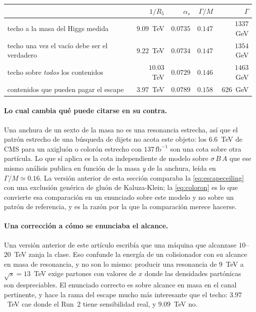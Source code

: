 \documentclass[11pt,a4paper]{article}
\begin{document}
\begin{center}\small
{}
\begin{tabular}{lrrrr}
\toprule
\rowcolor{hdrblue!10} & $1/R_5$ & $\alpha_s$ & $\Gamma/M$ & $\Gamma$\\
\midrule
\rowcolor{amber!14}techo a la masa del Higgs medida & $9.09$~TeV & $0.0735$ & $0.147$ & $1337$~GeV\\
techo una vez el vacío debe ser el verdadero & $9.22$~TeV & $0.0734$ & $0.147$ & $1354$~GeV\\
techo sobre \emph{todos} los contenidos & $10.03$~TeV & $0.0729$ & $0.146$ & $1463$~GeV\\
contenidos que pueden pagar el escape & $3.97$~TeV & $0.0789$ & $0.158$ & $626$~GeV\\
\bottomrule
\end{tabular}
\end{center}

\paragraph{Lo cual cambia qué puede citarse en su contra.} Una anchura de un sexto de la masa no es
una resonancia estrecha, así que el patrón estrecho de una búsqueda de dijets no acota este objeto:
los $6.6$~TeV de CMS para un axigluón o colorón estrecho con $137\,\mathrm{fb}^{-1}$
\cite{CMSdijet} son una cota sobre otra partícula. Lo que sí aplica es la cota
independiente de modelo sobre $\sigma\,B\,A$ que ese mismo análisis publica en función de la masa
\emph{y} de la anchura, leída en $\Gamma/M\simeq0.16$. La versión anterior de esta sección comparaba
la \eqref{eq:escapeceiling} con una exclusión genérica de gluón de Kaluza-Klein; la
\eqref{eq:coloron} es lo que convierte esa comparación en un enunciado sobre este modelo y no sobre
un patrón de referencia, y es la razón por la que la comparación merece hacerse.

\paragraph{Una corrección a cómo se enunciaba el alcance.} Una versión anterior de este artículo
escribía que una máquina que alcanzase $10$--$20$~TeV zanja la clase. Eso confunde la energía de un
colisionador con su alcance en masa de resonancia, y no son lo mismo: producir una resonancia de
$9$~TeV a $\sqrt s=13$~TeV exige partones con valores de $x$ donde las densidades partónicas son
despreciables. El enunciado correcto es sobre alcance en masa en el canal pertinente, y hace la
rama del escape mucho más interesante que el techo: $3.97$~TeV cae donde el Run~2 tiene
sensibilidad real, y $9.09$~TeV no.
\end{document}
